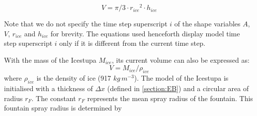 \documentclass[utf8]{frontiersSCNS} %
\begin{document}
\begin{equation} V = \pi/3 \cdot {r_{ice}}^2 \cdot h_{ice} \label{eqn:V} \end{equation}

Note that we do not specify the time step superscript $i$ of the shape variables $A$, $V$, $r_{ice}$ and $h_{ice}$ for
brevity.  The equations used henceforth display model time step superscript $i$ only if it is different from the
current time step.

With the mass of the Icestupa $M_{ice}$, its current volume can also be expressed as:
\begin{equation} V = M_{ice} / \rho_{ice} \label{eqn:V1} \end{equation} where $\rho_{ice}$ is the density of ice (917
$kg\, m^{-3}$). The model of the Icestupa is initialised with a thickness of $\Delta x$ (defined in \ref{section:EB})
and a circular area of radius $r_F$. The constant $r_F$ represents the mean spray radius of the fountain.  This fountain
spray radius is determined by 

\end{document}
